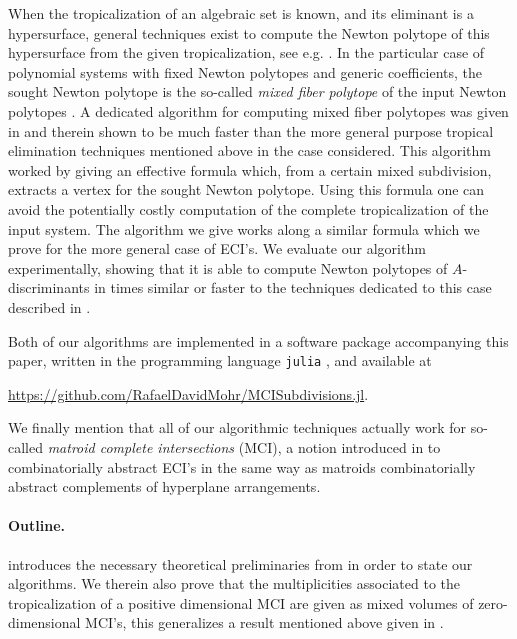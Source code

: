 \documentclass[a4paper]{article}
\theoremstyle{remark}
\begin{document}
When the tropicalization of an algebraic set is known, and its
eliminant is a hypersurface, general techniques exist to compute the
Newton polytope of this hypersurface from the given tropicalization,
see e.g. \cite{sturmfelsEliminationTheoryTropical,
  roseTropicalImplicitizationRevisited2025}. In the particular case of
polynomial systems with fixed Newton polytopes and generic
coefficients, the sought Newton polytope is the so-called {\em mixed
  fiber polytope} of the input Newton polytopes \cite{esterov2008,
  mcmullenMixedFibrePolytopes2004}. A dedicated algorithm for
computing mixed fiber polytopes was given in
\cite{mohrComputationNewtonPolytopes2025} and therein shown to be much
faster than the more general purpose tropical elimination techniques
mentioned above in the case considered. This algorithm worked by
giving an effective formula which, from a certain mixed subdivision,
extracts a vertex for the sought Newton polytope. Using this formula
one can avoid the potentially costly computation of the complete
tropicalization of the input system. The algorithm we give works along
a similar formula which we prove for the more general case of ECI's.
We evaluate our algorithm experimentally, showing that it is able to
compute Newton polytopes of $A$-discriminants in times similar or
faster to the techniques dedicated to this case described in
\cite{roseTropicalImplicitizationRevisited2025}.

Both of our algorithms are implemented in a software package
accompanying this paper, written in the programming language
\texttt{julia} \cite{bezanson2017}, and available at
\begin{center}
  \url{https://github.com/RafaelDavidMohr/MCISubdivisions.jl}.
\end{center}
We finally mention that all of our algorithmic techniques actually
work for so-called {\em matroid complete intersections} (MCI), a
notion introduced in \cite{esterovEngineeredCompleteIntersections2024,
  esterovEngineeredCompleteIntersections2025} to combinatorially
abstract ECI's in the same way as matroids combinatorially abstract
complements of hyperplane arrangements.


\paragraph*{Outline.}

 introduces the necessary theoretical preliminaries
from \cite{esterovEngineeredCompleteIntersections2024,
  esterovEngineeredCompleteIntersections2025} in order to state our
algorithms. We therein also prove that the multiplicities associated
to the tropicalization of a positive dimensional MCI are given as
mixed volumes of zero-dimensional MCI's, this generalizes a result
mentioned above given in \cite{sturmfelsEliminationTheoryTropical}.
\end{document}
